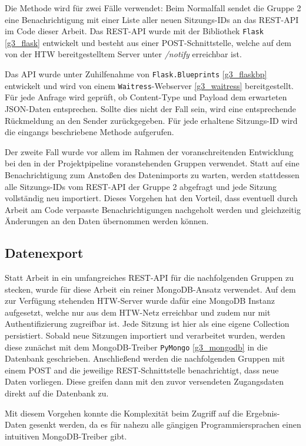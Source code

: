 Die Methode wird für zwei Fälle verwendet: 
Beim Normalfall sendet die Gruppe 2 eine Benachrichtigung mit einer Liste aller neuen Sitzungs-IDs an das REST-API im Code dieser Arbeit. 
Das REST-API wurde mit der Bibliothek \texttt{Flask} \ref{g3_flask} entwickelt und besteht aus einer POST-Schnittstelle, welche auf dem von der HTW bereitgestelltem Server unter \textit{/notify} erreichbar ist. 

Das API wurde unter Zuhilfenahme von \texttt{Flask.Blueprints} \ref{g3_flaskbp} entwickelt und wird von einem \texttt{Waitress}-Webserver \ref{g3_waitress} bereitgestellt. 
Für jede Anfrage wird geprüft, ob Content-Type und Payload dem erwarteten JSON-Daten entsprechen. 
Sollte dies nicht der Fall sein, wird eine entsprechende Rückmeldung an den Sender zurückgegeben. 
Für jede erhaltene Sitzungs-ID wird die eingangs beschriebene Methode aufgerufen. 

Der zweite Fall wurde vor allem im Rahmen der voranschreitenden Entwicklung bei den in der Projektpipeline voranstehenden Gruppen verwendet. 
Statt auf eine Benachrichtigung zum Anstoßen des Datenimports zu warten, werden stattdessen alle Sitzungs-IDs vom REST-API der Gruppe 2 abgefragt und jede Sitzung vollständig neu importiert. 
Dieses Vorgehen hat den Vorteil, dass eventuell durch Arbeit am Code verpasste Benachrichtigungen nachgeholt werden und gleichzeitig Änderungen an den Daten übernommen werden können. 

\subsection{Datenexport}
\label{g3export}
Statt Arbeit in ein umfangreiches REST-API für die nachfolgenden Gruppen zu stecken, wurde für diese Arbeit ein reiner MongoDB-Ansatz verwendet. 
Auf dem zur Verfügung stehenden HTW-Server wurde dafür eine MongoDB Instanz aufgesetzt, welche nur aus dem HTW-Netz erreichbar und zudem nur mit Authentifizierung zugreifbar ist. 
Jede Sitzung ist hier als eine eigene Collection persistiert. 
Sobald neue Sitzungen importiert und verarbeitet wurden, werden diese zunächst mit dem MongoDB-Treiber \texttt{PyMongo} \ref{g3_mongodb} in die Datenbank geschrieben. 
Anschließend werden die nachfolgenden Gruppen mit einem POST and die jeweilige REST-Schnittstelle benachrichtigt, dass neue Daten vorliegen. 
Diese greifen dann mit den zuvor versendeten Zugangsdaten direkt auf die Datenbank zu. 

Mit diesem Vorgehen konnte die Komplexität beim Zugriff auf die Ergebnis-Daten gesenkt werden, da es für nahezu alle gängigen Programmiersprachen einen intuitiven MongoDB-Treiber gibt. 

